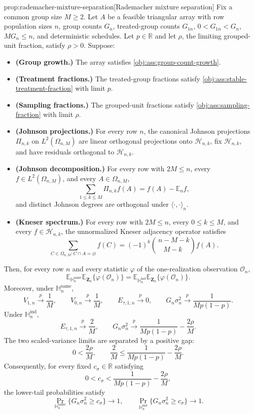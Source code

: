 \begin{propositionv}{prop:rademacher-mixture-separation}[Rademacher mixture separation]
Fix a common group size \(M\ge 2\).  Let \(A\) be a feasible triangular array with row population sizes \(n\), group counts \(G_n\), treated-group counts \(G_{1n}\), \(0<G_{1n}<G_n\), \(M G_n\le n\), and deterministic schedules.  Let \(p\in\mathbb R\) and let \(\rho\), the limiting grouped-unit fraction, satisfy \(\rho>0\).  Suppose:
\begin{itemize}
\item \textbf{(Group growth.)} The array satisfies \cref{obj:ass:group-count-growth}.
\item \textbf{(Treatment fractions.)} The treated-group fractions satisfy \cref{obj:ass:stable-treatment-fraction} with limit \(p\).
\item \textbf{(Sampling fractions.)} The grouped-unit fractions satisfy \cref{obj:ass:sampling-fraction} with limit \(\rho\).
\item \textbf{(Johnson projections.)} For every row \(n\), the canonical Johnson projections \(\Pi_{n,k}\) on \(L^2(\Omega_{n,M})\) are linear orthogonal projections onto \(\mathcal H_{n,k}\), fix \(\mathcal H_{n,k}\), and have residuals orthogonal to \(\mathcal H_{n,k}\).
\item \textbf{(Johnson decomposition.)} For every row with \(2M\le n\), every \(f\in L^2(\Omega_{n,M})\), and every \(A\in\Omega_{n,M}\),
\[
\sum_{1\le k\le M}\Pi_{n,k}f(A)=f(A)-\mathbb E_n f,
\]
and distinct Johnson degrees are orthogonal under \(\langle\cdot,\cdot\rangle_n\).
\item \textbf{(Kneser spectrum.)} For every row with \(2M\le n\), every \(0\le k\le M\), and every \(f\in\mathcal H_{n,k}\), the unnormalized Kneser adjacency operator satisfies
\[
\sum_{C\in\Omega_{n,M}:C\cap A=\varnothing} f(C)
=
(-1)^k {\,n-M-k\choose M-k\,} f(A).
\]
\end{itemize}
Then, for every row \(n\) and every statistic \(\varphi\) of the one-realization observation \(\mathcal O_n\),
\[
\mathbb E_{\mathbb H_n^{\mathrm{same}}}\mathbb E_{\mathbf Z_n}\{\varphi(\mathcal O_n)\}
=
\mathbb E_{\mathbb H_n^{\mathrm{ind}}}\mathbb E_{\mathbf Z_n}\{\varphi(\mathcal O_n)\}.
\]
Moreover, under \(\mathbb H_n^{\mathrm{same}}\),
\[
V_{1,n}\stackrel{p}{\longrightarrow}\frac1M,
\qquad
V_{0,n}\stackrel{p}{\longrightarrow}\frac1M,
\qquad
E_{\tau,1,n}\stackrel{p}{\longrightarrow}0,
\qquad
G_n\sigma_n^2\stackrel{p}{\longrightarrow}\frac{1}{M p(1-p)}.
\]
Under \(\mathbb H_n^{\mathrm{ind}}\),
\[
E_{\tau,1,n}\stackrel{p}{\longrightarrow}\frac2M,
\qquad
G_n\sigma_n^2\stackrel{p}{\longrightarrow}\frac{1}{M p(1-p)}-\frac{2\rho}{M}.
\]
The two scaled-variance limits are separated by a positive gap:
\[
0<\frac{2\rho}{M},
\qquad
\frac2M\le \frac{1}{M p(1-p)}-\frac{2\rho}{M}.
\]
Consequently, for every fixed \(c_\sigma\in\mathbb R\) satisfying
\[
0<c_\sigma<\frac{1}{M p(1-p)}-\frac{2\rho}{M},
\]
the lower-tail probabilities satisfy
\[
\Pr_{\mathbb H_n^{\mathrm{same}}}\{G_n\sigma_n^2\ge c_\sigma\}\to 1,
\qquad
\Pr_{\mathbb H_n^{\mathrm{ind}}}\{G_n\sigma_n^2\ge c_\sigma\}\to 1.
\]
\end{propositionv}

